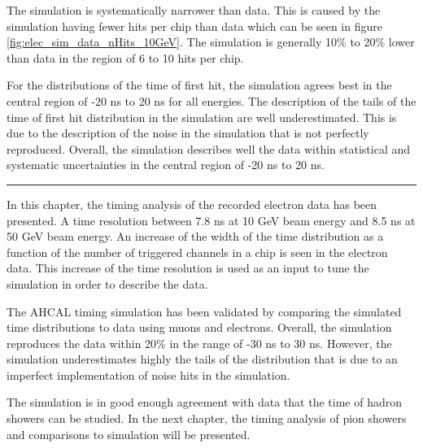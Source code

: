 The simulation is systematically narrower than data. This is caused by the simulation having fewer hits per chip than data which can be seen in figure \ref{fig:elec_sim_data_nHits_10GeV}. The simulation is generally 10\% to 20\% lower than data in the region of 6 to 10 hits per chip.

For the distributions of the time of first hit, the simulation agrees best in the central region of -20 ns to 20 ns for all energies. The description of the tails of the time of first hit distribution in the simulation are well underestimated. This is due to the description of the noise in the simulation that is not perfectly reproduced. Overall, the simulation describes well the data within statistical and systematic uncertainties in the central region of -20 ns to 20 ns.

\begin{center}
	\rule{0.5\textwidth}{.4pt}
\end{center}

In this chapter, the timing analysis of the recorded electron data has been presented. A time resolution between 7.8 ns at 10 GeV beam energy and 8.5 ns at 50 GeV beam energy. An increase of the width of the time distribution as a function of the number of triggered channels in a chip is seen in the electron data. This increase of the time resolution is used as an input to tune the simulation in order to describe the data.

The AHCAL timing simulation has been validated by comparing the simulated time distributions to data using muons and electrons. Overall, the simulation reproduces the data within 20\% in the range of -30 ns to 30 ns. However, the simulation underestimates highly the tails of the distribution that is due to an imperfect implementation of noise hits in the simulation.

The simulation is in good enough agreement with data that the time of hadron showers can be studied. In the next chapter, the timing analysis of pion showers and comparisons to simulation will be presented.
